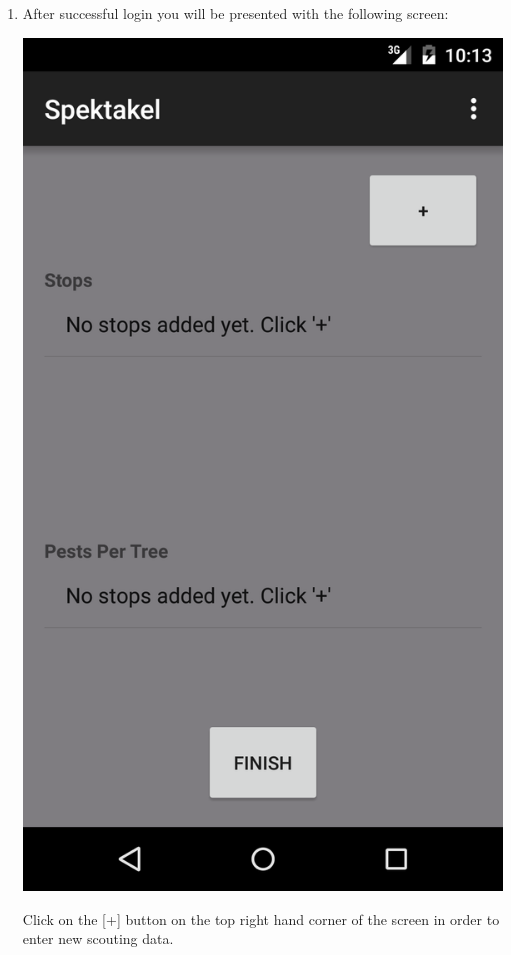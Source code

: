 \documentclass[11pt,a4paper,titlepage]{article}
\begin{document}
\begin{enumerate}
\begin{center}
			\end{center}
		\item After successful login you will be presented with the following screen:
			\begin{center}
				\includegraphics[scale=0.13]{shot2}
			\end{center}
			Click on the [+] button on the top right hand corner of the screen in order to enter new scouting data.


\end{enumerate}
\end{document}

